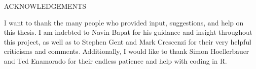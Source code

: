 
\begin{center}
\vspace*{52pt}
{ACKNOWLEDGEMENTS}
\end{center}

I want to thank the many people who provided input, suggestions, and help on this thesis. I am indebted to Navin Bapat for his guidance and insight throughout this project, as well as to Stephen Gent and Mark Crescenzi for their very helpful criticisms and comments. Additionally, I would like to thank Simon Hoellerbauer and Ted Enamorado for their endless patience and help with coding in R. 

\clearpage
